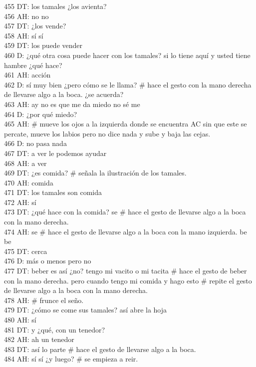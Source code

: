 455 DT: los tamales ¿los avienta?\\
456 AH: no no\\
457 DT: ¿los vende?\\
458 AH: sí sí\\
459 DT: los puede vender\\
460 D: ¿qué otra cosa puede hacer con los tamales? si lo tiene aquí y usted tiene hambre ¿qué hace?\\
461 AH: acción\\
462 D: sí muy bien ¿pero cómo se le llama? # hace el gesto con la mano derecha de llevarse algo a la boca. ¿se acuerda? \\
463 AH: ay no es que me da miedo no sé me \\
464 D: ¿por qué miedo?\\
465 AH: # mueve los ojos a la izquierda donde se encuentra AC sin que este se percate, mueve los labios pero no dice nada y sube y baja las cejas.\\
466 D: no pasa nada\\
467 DT: a ver le podemos ayudar\\
468 AH: a ver\\
469 DT: ¿es comida? # señala la ilustración de los tamales.\\
470 AH: comida\\
471 DT: los tamales son comida\\
472 AH: sí\\
473 DT: ¿qué hace con la comida? se # hace el gesto de llevarse algo a la boca con la mano derecha.\\
474 AH: se # hace el gesto de llevarse algo a la boca con la mano izquierda. be be\\
475 DT: cerca\\
476 D: más o menos pero no\\
477 DT: beber es así ¿no? tengo mi vacito o mi tacita # hace el gesto de beber con la mano derecha. pero cuando tengo mi comida y hago esto # repite el gesto de llevarse algo a la boca con la mano derecha.\\
478 AH: # frunce el seño.\\
479 DT: ¿cómo se come sus tamales? así abre la hoja\\
480 AH: sí\\
481 DT: y ¿qué, con un tenedor?\\
482 AH: ah un tenedor\\
483 DT: así lo parte # hace el gesto de llevarse algo a la boca.\\
484 AH: sí sí ¿y luego? # se empieza a reir.\\
